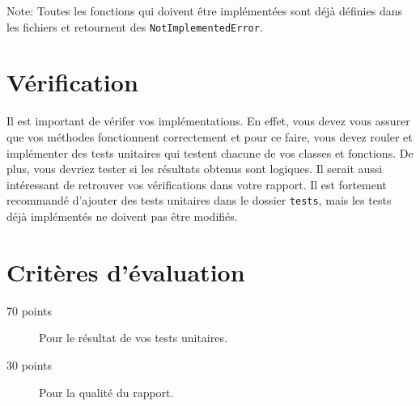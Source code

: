 \documentclass[12pt, letterpaper]{article}
\begin{document}
\bigskip

\noindent Note: Toutes les fonctions qui doivent être implémentées sont déjà définies dans les fichiers
et retournent des \texttt{NotImplementedError}.


\section{Vérification}\label{sec:verification}

Il est important de vérifer vos implémentations.
En effet, vous devez vous assurer que vos méthodes fonctionnent correctement et pour ce faire, vous devez rouler et
implémenter des tests unitaires qui testent chacune de vos classes et fonctions.
De plus, vous devriez tester si les résultats obtenus sont logiques.
Il serait aussi intéressant de retrouver vos vérifications dans votre rapport.
Il est fortement recommandé d'ajouter des tests unitaires dans le dossier \texttt{tests}, mais les tests déjà
implémentés ne doivent pas être modifiés.


\section{Critères d'évaluation}\label{sec:criteres-d'evaluation}

\begin{description}
  \item[70 points] Pour le résultat de vos tests unitaires.
  \item[30 points] Pour la qualité du rapport.
\end{description}
\end{document}
